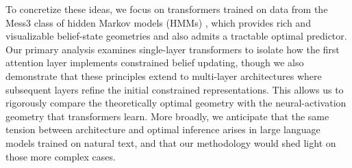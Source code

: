 \documentclass{article}
\theoremstyle{plain}
\theoremstyle{definition}
\theoremstyle{remark}
\begin{document}


To concretize these ideas, we focus on transformers trained on data from the Mess3 class of hidden Markov models (HMMs) \citep{Marzen_2017}, which provides rich and visualizable belief-state geometries and also admits a tractable optimal predictor. Our primary analysis examines single-layer transformers to isolate how the first attention layer implements constrained belief updating, though we also demonstrate that these principles extend to multi-layer architectures where subsequent layers refine the initial constrained representations. This allows us to rigorously compare the theoretically optimal geometry with the neural-activation geometry that transformers learn. More broadly, we anticipate that the same tension between architecture and optimal inference arises in large language models trained on natural text, and that our methodology would shed light on those more complex cases.


\end{document}
